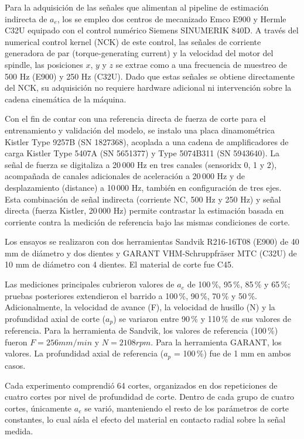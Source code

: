 \documentclass[12pt, letterpaper]{article}
\begin{document}
Para la adquisición de las señales que alimentan al pipeline de estimación indirecta de $a_e$, los se empleo dos centros de mecanizado Emco E900 y Hermle C32U equipado con el control numérico Siemens SINUMERIK 840D. A través del numerical control kernel (NCK) de este control, las señales de corriente generadora de par (torque-generating current) y la velocidad del motor del spindle, las posiciones $x$, $y$ y $z$ se extrae como a una frecuencia de muestreo de 500 Hz (E900) y 250 Hz (C32U). Dado que estas señales se obtiene directamente del NCK, su adquisición no requiere hardware adicional ni intervención sobre la cadena cinemática de la máquina.

Con el fin de contar con una referencia directa de fuerza de corte para el entrenamiento y validación del modelo, se instalo una placa dinamométrica Kistler Type 9257B (SN 1827368), acoplada a una cadena de amplificadores de carga Kistler Type 5407A (SN 5651377) y Type 5074B311 (SN 5943640). La señal de fuerza se digitaliza a 20\,000 Hz en tres canales (sensoridx 0, 1 y 2), acompañada de canales adicionales de aceleración a 20\,000 Hz y de desplazamiento (distance) a 10\,000 Hz, también en configuración de tres ejes. Esta combinación de señal indirecta (corriente NC, 500 Hz y 250 Hz) y señal directa (fuerza Kistler, 20\,000 Hz) permite contrastar la estimación basada en corriente contra la medición de referencia bajo las mismas condiciones de corte.

Los ensayos se realizaron con dos herramientas  Sandvik R216-16T08 (E900) de 40 mm de diámetro y dos dientes y GARANT VHM-Schruppfräser MTC (C32U) de 10 mm de diámetro con 4 dientes. El material de corte fue C45.

Las mediciones principales cubrieron valores de $a_e$ de 100\,\%, 95\,\%, 85\,\% y 65\,\%; pruebas posteriores extendieron el barrido a 100\,\%, 90\,\%, 70\,\% y 50\,\%. Adicionalmente, la velocidad de avance (F), la velocidad de husillo (N) y la profundidad axial de corte ($a_p$) se variaron entre 90\,\% y 110\,\% de sus valores de referencia. Para la herramienta de Sandvik, los valores de referencia (100\,\%) fueron $F = 256 mm/min$ y $N = 2108 rpm$. Para la herramienta GARANT, los valores. La profundidad axial de referencia ($a_p$ = 100\,\%) fue de 1 mm en ambos casos.

Cada experimento comprendió 64 cortes, organizados en dos repeticiones de cuatro cortes por nivel de profundidad de corte. Dentro de cada grupo de cuatro cortes, únicamente $a_e$ se varió, manteniendo el resto de los parámetros de corte constantes, lo cual aísla el efecto del material en contacto radial sobre la señal medida.
\end{document}
